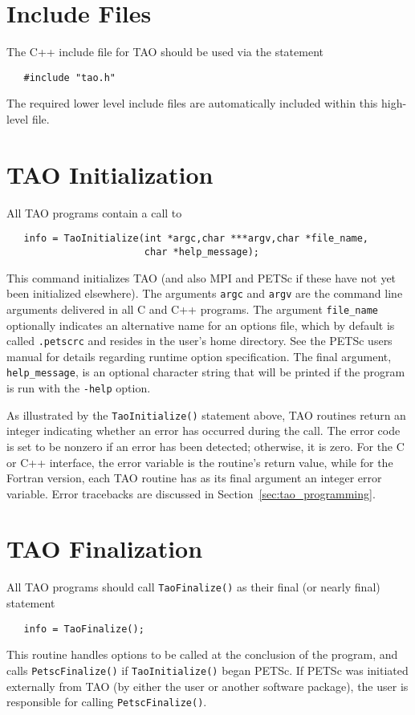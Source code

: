 \section{Include Files}

The C++ include file for TAO should be used via the statement
\begin{verbatim}
   #include "tao.h"
\end{verbatim}
\noindent
The required lower level include files are automatically included
within this high-level file.

\section{TAO Initialization}
\label{sec:initialization}

All TAO programs contain a call to 
\begin{verbatim}
   info = TaoInitialize(int *argc,char ***argv,char *file_name, 
                        char *help_message);
\end{verbatim}
\noindent 
This command initializes TAO (and also MPI and PETSc if these have not
yet been initialized elsewhere).  The arguments \texttt{argc} and
\texttt{argv} are the command line arguments delivered in all C and
C++ programs.  The argument
\texttt{file\_name} optionally indicates an alternative name for an
options file, which by default is called \texttt{.petscrc} and resides
in the user's home directory.  See the PETSc users manual for details
regarding runtime option specification.  The final argument,
\texttt{help\_message}, is an optional character string that will be
printed if the program is run with the \texttt{-help} option.

As illustrated by the \texttt{TaoInitialize()} statement above, TAO
routines return an integer indicating whether an error has occurred
during the call.  The error code is set to be nonzero if an error has
been detected; otherwise, it is zero.  For the C or C++ interface, the
error variable is the routine's return value, while for the Fortran
version, each TAO routine has as its final argument an integer error
variable.  Error tracebacks are discussed in
Section~\ref{sec:tao_programming}.

\section{TAO Finalization}

All TAO programs should call \texttt{TaoFinalize()}
 as their final (or nearly final) statement
\begin{verbatim}
   info = TaoFinalize();
\end{verbatim}
\noindent
This routine handles options to be called at the conclusion of the
program, and calls \texttt{PetscFinalize()} %
if \texttt{TaoInitialize()} began PETSc. If PETSc was initiated
externally from TAO (by either the user or another software package),
the user is responsible for calling \texttt{PetscFinalize()}.

